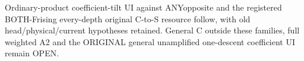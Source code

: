 Ordinary-product coefficient-tilt UI against ANYopposite and the
registered BOTH-Frising every-depth original C-to-S resource follow,
with old head/physical/current hypotheses retained. General C
outside these families, full weighted A2 and the ORIGINAL general
unamplified one-descent coefficient UI remain OPEN.
